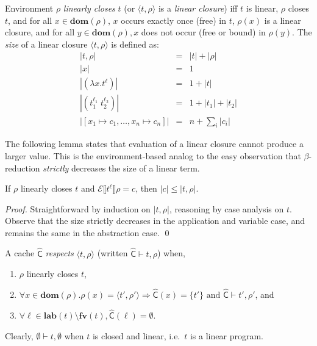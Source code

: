 \documentclass{llncs}
\newcommand{\loves}{\ensuremath{\vdash}}
\newcommand\fv[1]{\ensuremath{\mathbf{fv}(#1)}}
\newcommand\lab[1]{\ensuremath{\mathbf{lab}(#1)}}
\newcommand\dom[1]{\ensuremath{\mathbf{dom}(#1)}}
\newcommand\ev[1]{\ensuremath{\mathcal{E}\sem{#1}}}
\newcommand\sem[1]{\ensuremath{\llbracket #1 \rrbracket}}
\newcommand\cache{\widehat{\mathsf{C}}}
\begin{document}
\begin{definition}
Environment $\rho$ {\em linearly closes} $t$ (or $\langle
t,\rho\rangle$ is a {\em linear closure}) iff $t$ is linear, $\rho$
closes $t$, and for all $x\in\dom{\rho}$, $x$ occurs exactly once
(free) in $t$, $\rho(x)$ is a linear closure, and for all
$y\in\dom{\rho}, x$ does not occur (free or bound) in $\rho(y)$. The
{\em size} of a linear closure $\langle t,\rho\rangle$ is defined as:
\begin{eqnarray*}
|t,\rho| & = & |t|+|\rho|\\
|x| & = & 1\\
|(\lambda x.t^\ell)| & = & 1+|t|\\
|(t_1^{\ell_1}\; t_2^{\ell_2})| & = & 1+|t_1|+|t_2|\\
|[x_1\mapsto c_1,\dots,x_n\mapsto c_n]| & = & n+\sum_i |c_i|
\end{eqnarray*}
\end{definition}

The following lemma states that evaluation of a linear closure cannot
produce a larger value.  This is the environment-based analog to the
easy observation that $\beta$-reduction {\em strictly} decreases the
size of a linear term.
\begin{lemma}\label{lem:smaller}
If $\rho$ linearly closes $t$ and $\ev{t^\ell}\rho = c$, then
$|c|\leq|t,\rho|$.
\end{lemma}
\begin{proof}
Straightforward by induction on $|t,\rho|$, reasoning by case analysis
on $t$.  Observe that the size strictly decreases in the application
and variable case, and remains the same in the abstraction case.  \qed
\end{proof}

\begin{definition}
A cache $\cache$ {\em respects} $\langle t,\rho\rangle$ (written $\cache\loves
t,\rho$) when,
\begin{enumerate}
\item $\rho$ linearly closes $t$,
\item $\forall x \in \dom{\rho} . \rho(x) = \langle t',\rho'\rangle
\Rightarrow \cache(x) = \{t'\} \mbox { and } \cache\loves t',\rho'$, and
\item $\forall \ell \in \lab{t}\setminus\fv{t}, \cache(\ell) = \emptyset$.
\end{enumerate}
\end{definition}
Clearly, $\emptyset\loves t,\emptyset$ when $t$ is closed and linear,
i.e.~$t$ is a linear program.
\end{document}
